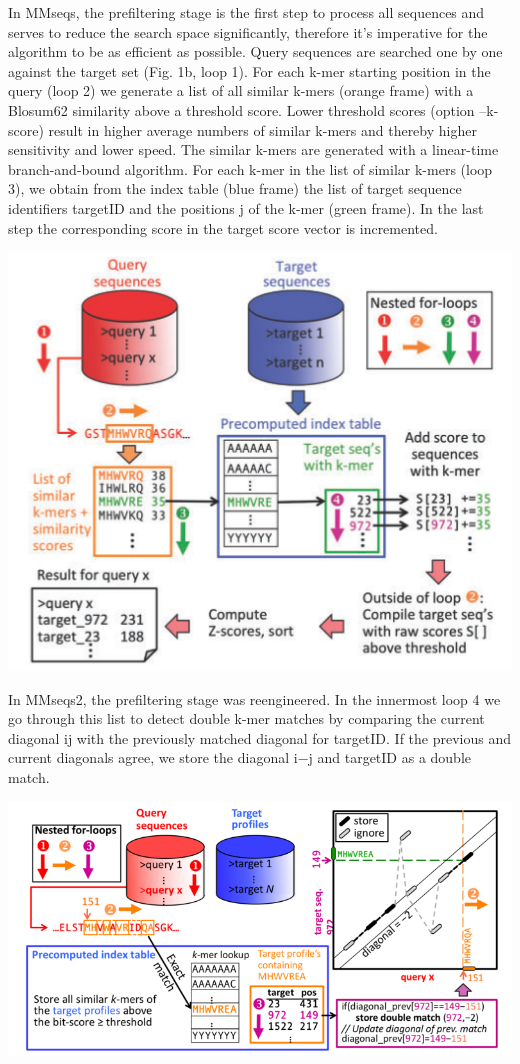 In MMseqs, the prefiltering stage is the first step to process all sequences and serves to reduce the search space significantly, therefore it's imperative for the algorithm to be as efficient as possible. Query sequences are searched one by one against the target set (Fig. 1b, loop 1). For each k-mer starting position in the query (loop 2) we generate a list of all similar k-mers (orange frame) with a Blosum62 similarity above a threshold score. Lower threshold scores (option --k-score) result in higher average numbers of similar k-mers and thereby higher sensitivity and lower speed. The similar k-mers are generated with a linear-time branch-and-bound algorithm. For each k-mer in the list of similar k-mers (loop 3), we obtain from the index table (blue frame) the list of target sequence identiﬁers targetID and the positions j of the k-mer (green frame). In the last step the corresponding score in the target score vector is incremented.

\begin{center}
\includegraphics[scale=0.3]{graphics/MMseqs_prefilter.png}
\end{center}

In MMseqs2, the prefiltering stage was reengineered. In the innermost loop 4 we go through this list to detect double k-mer matches by comparing the current diagonal ij with the previously matched diagonal for targetID. If the previous and current diagonals agree, we store the diagonal i−j and targetID as a double match.

\begin{center}
\includegraphics[scale=0.5]{graphics/MMseqs2_prefilter.png}
\end{center}